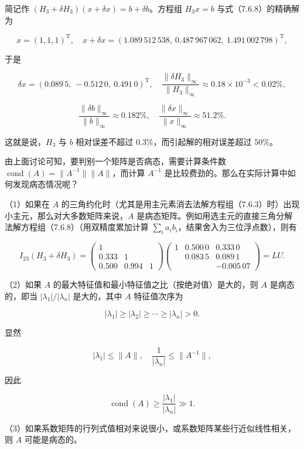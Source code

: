 简记作 \((H_3+\delta H_3)(x+\delta x)=b+\delta b\)。方程组 \(H_3x=b\) 与式（7.6.8）的精确解为

\[
x=(1,1,1)^{\mathrm T},\quad
x+\delta x=(1.089\,512\,538,\ 0.487\,967\,062,\ 1.491\,002\,798)^{\mathrm T},
\]

于是

\[
\delta x=(0.089\,5,\ -0.512\,0,\ 0.491\,0)^{\mathrm T},\quad
\frac{\|\delta H_3\|_\infty}{\|H_3\|_\infty}\approx0.18\times10^{-3}<0.02\%,
\]

\[
\frac{\|\delta b\|_\infty}{\|b\|_\infty}\approx0.182\%,\quad
\frac{\|\delta x\|_\infty}{\|x\|_\infty}\approx51.2\%.
\]

这就是说，\(H_3\) 与 \(b\) 相对误差不超过 \(0.3\%\)，而引起解的相对误差超过 \(50\%\)。

由上面讨论可知，要判别一个矩阵是否病态，需要计算条件数 \(\operatorname{cond}(A)=\|A^{-1}\|\|A\|\)，而计算 \(A^{-1}\) 是比较费劲的。那么在实际计算中如何发现病态情况呢？

（1）如果在 \(A\) 的三角约化时（尤其是用主元素消去法解方程组（7.6.3）时）出现小主元，那么对大多数矩阵来说，\(A\) 是病态矩阵。例如用选主元的直接三角分解法解方程组（7.6.8）（用双精度累加计算 \(\sum_i a_ib_i\)，结果舍入为三位浮点数），则有

\[
I_{23}(H_3+\delta H_3)
=\begin{pmatrix}
1&&\\
0.333&1&\\
0.500&0.994&1
\end{pmatrix}
\begin{pmatrix}
1&0.500\,0&0.333\,0\\
&0.083\,5&0.089\,1\\
&&\boxed{-0.005\,07}
\end{pmatrix}
=LU.
\]

（2）如果 \(A\) 的最大特征值和最小特征值之比（按绝对值）是大的，则 \(A\) 是病态的，即当 \(|\lambda_1|/|\lambda_n|\) 是大的，其中 \(A\) 特征值次序为

\[
|\lambda_1|\geqslant|\lambda_2|\geqslant\cdots\geqslant|\lambda_n|>0.
\]

显然

\[
|\lambda_1|\leqslant\|A\|,\quad\frac1{|\lambda_n|}\leqslant\|A^{-1}\|,
\]

因此

\[
\operatorname{cond}(A)\geqslant\frac{|\lambda_1|}{|\lambda_n|}\gg1.
\]

（3）如果系数矩阵的行列式值相对来说很小，或系数矩阵某些行近似线性相关，则 \(A\) 可能是病态的。

